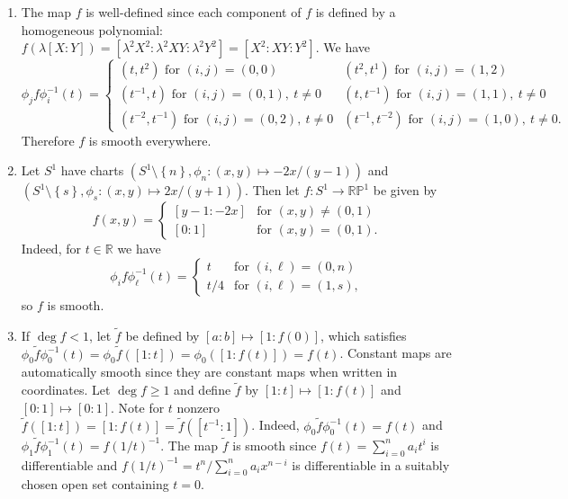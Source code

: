 \documentclass[11pt,leqno]{article}
\theoremstyle{plain}
\theoremstyle{definition}
\numberwithin{equation}{section}
\numberwithin{lem}{section}
\newcommand{\cbr}[1]{\left\{#1\right\}}
\begin{document}
\begin{enumerate}
\begin{enumerate}
    \end{enumerate}
    \item The map $f$ is well-defined since each component of $f$ is defined by a homogeneous polynomial: $f(\lambda[X:Y]) = [\lambda^2X^2:\lambda^2XY:\lambda^2Y^2] = [X^2:XY:Y^2]$. We have  
    \[\phi_jf\phi_i^{-1}(t)=\begin{cases}
      (t,t^2) \text{ for } (i,j) = (0,0) & (t^2,t^1) \text{ for } (i,j) = (1,2)\\
      (t^{-1},t) \text{ for } (i,j) = (0,1), ~t\neq 0 & (t,t^{-1}) \text{ for } (i,j) = (1,1),~ t\neq 0\\
      (t^{-2},t^{-1}) \text{ for } (i,j) = (0,2),~ t\neq 0 & (t^{-1},t^{-2}) \text{ for } (i,j) = (1,0),~ t\neq 0.
    \end{cases}\]
    Therefore $f$ is smooth everywhere.
    \item Let $S^1$ have charts $(S^1\setminus\cbr{n},\phi_n\colon(x,y)\mapsto -2x/(y-1))$ and $(S^1\setminus\cbr{s},\phi_s\colon (x,y)\mapsto 2x/(y+1))$. Then let $f\colon S^1\to \mathbb{RP}^1$ be given by 
    \[f(x,y) = \begin{cases}
      [y-1:-2x]& \text{for }(x,y) \neq (0,1)\\
      [0: 1] & \text{for }(x,y) = (0,1).
    \end{cases}\]
    Indeed, for $t\in\mathbb R$ we have 
    \[\phi_if\phi_\ell^{-1}(t) = \begin{cases}
       t & \text{for } (i,\ell) = (0,n)\\
       t/4 & \text{for } (i,\ell) = (1,s),
    \end{cases}\] so $f$ is smooth.
    \item If $\deg f < 1$, let $\tilde f$ be defined by $[a:b]\mapsto [1:f(0)]$, which satisfies $\phi_0\tilde f\phi_0^{-1}(t) = \phi_0\tilde f([1:t]) = \phi_0([1:f(t)]) = f(t)$. Constant maps are automatically smooth since they are constant maps when written in coordinates. Let $\deg f \geq 1$ and define $\tilde f$ by $[1:t]\mapsto [1:f(t)]$ and $[0:1]\mapsto [0:1]$. Note for $t$ nonzero $\tilde f([1:t]) = [1:f(t)] = \tilde f([t^{-1}:1])$. Indeed, $\phi_0\tilde f\phi_0^{-1}(t) = f(t)$ and $\phi_1\tilde f\phi_1^{-1}(t) = f(1/t)^{-1}$. The map $\tilde f$ is smooth since $f(t) = \sum_{i=0}^n a_it^i$ is differentiable and $f(1/t)^{-1} = t^n/\sum_{i=0}^n a_ix^{n-i}$ is differentiable in a suitably chosen open set containing $t=0$. 

\end{enumerate}
\end{document}
